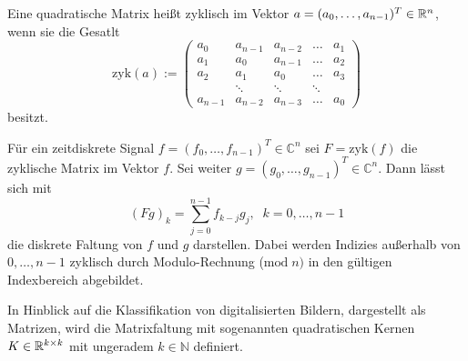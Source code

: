 \begin{defi}
    Eine quadratische Matrix heißt zyklisch im Vektor $a=(a_0, \ldots, a_{n-1})^T \in \mathbb{R}^n$, wenn sie die Gesatlt
    \begin{equation*}
        \mathrm{zyk}(a):=
        \begin{pmatrix}
            a_0 & a_{n-1} &a_{n-2} &\ldots &a_1 \\ 
            a_1 & a_0 &a_{n-1} & \ldots &a_2 \\
            a_2 & a_1 &a_0 & \ldots &a_3 \\
             &\ddots &\ddots &\ddots & \\
            a_{n-1} &a_{n-2} &a_{n-3} &\ldots &a_0
        \end{pmatrix}
    \end{equation*}
    besitzt.
\end{defi}    
    
\begin{bem}
Für ein zeitdiskrete Signal $f=(f_0, \ldots, f_{n-1})^T \in \mathbb{C}^{n}$ sei $F=\mathrm{zyk}(f)$ die zyklische Matrix im Vektor $f$. Sei weiter $g=(g_0, \ldots, g_{n-1})^T \in \mathbb{C}^{n}$. Dann lässt sich mit
    \begin{equation*}
        (F g)_k=\sum_{j=0}^{n-1}  f_{k-j} g_j,  \; \; k=0, \ldots, n-1
    \end{equation*}
    die diskrete Faltung von $f$ und $g$ darstellen. Dabei werden Indizies außerhalb von $0, \ldots, n-1$ zyklisch durch Modulo-Rechnung ($\mathrm{mod} \; n)$ in den gültigen Indexbereich abgebildet.
\end{bem}

In Hinblick auf die Klassifikation von digitalisierten Bildern, dargestellt als Matrizen, wird die Matrixfaltung mit sogenannten quadratischen Kernen $K \in \mathbb{R}^{k \times k}$ mit ungeradem $k \in \mathbb{N}$ definiert.
 



